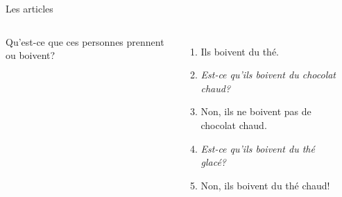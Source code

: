 \documentclass{beamer}
\begin{document}

  \begin{frame}{Les articles}
    \begin{columns}
        Qu'est-ce que ces personnes prennent ou boivent?
        \begin{enumerate}
          \item<2-> Ils boivent du thé.
          \item<2-> \emph{Est-ce qu'ils boivent du chocolat chaud?}
          \item<3-> Non, ils ne boivent pas de chocolat chaud.
          \item<3-> \emph{Est-ce qu'ils boivent du thé glacé?}
          \item<4-> Non, ils boivent du thé chaud!
        \end{enumerate}
        \begin{minipage}[c][0.6\textwidth]{\linewidth}
          \begin{center}
          \end{center}
        \end{minipage}
    \end{columns}
  \end{frame}
\end{document}
